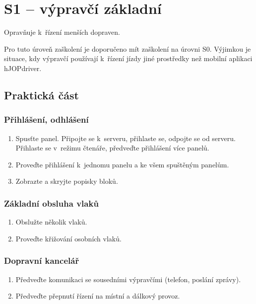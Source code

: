 \documentclass[12pt,a4paper]{article}
\begin{document}
\section{S1 – výpravčí základní}

Opravňuje k~řízení menších dopraven.

Pro tuto úroveň zaškolení je doporučeno mít zaškolení na úrovni S0. Výjimkou
je situace, kdy výpravčí používají k~řízení jízdy jiné prostředky než mobilní
aplikaci hJOPdriver.

\subsection{Praktická část}

\subsubsection*{Přihlášení, odhlášení}
\begin{enumerate}[leftmargin=*]
\item Spusťte panel. Připojte se k~serveru, přihlaste se, odpojte se od
serveru. Přihlaste se v~režimu čtenáře, předveďte přihlášení více panelů.
\item Proveďte přihlášení k~jednomu panelu a ke všem spuštěným panelům.
\item Zobrazte a skryjte popisky bloků.
\end{enumerate}

\subsubsection*{Základní obsluha vlaků}
\begin{enumerate}[leftmargin=*]
\item Obslužte několik vlaků.
\item Proveďte křižování osobních vlaků.
\end{enumerate}

\subsubsection*{Dopravní kancelář}
\begin{enumerate}[leftmargin=*]
\item Předveďte komunikaci se sousedními výpravčími (telefon, poslání zprávy).
\item Předveďte přepnutí řízení na místní a dálkový provoz.
\end{enumerate}
\end{document}
